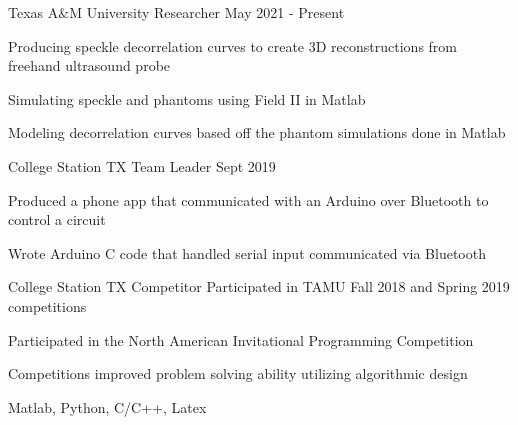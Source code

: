 \documentclass[11pt]{article} %
\begin{document}
\begin{description}
\squish

{Texas A$\&$M University}
{Researcher}
{May 2021 - Present}

Producing speckle decorrelation curves to create 3D reconstructions from freehand ultrasound probe

Simulating speckle and phantoms using Field II in Matlab

Modeling decorrelation curves based off the phantom simulations done in Matlab


{College Station TX}
{Team Leader}
{Sept 2019}

Produced a phone app that communicated with an Arduino over Bluetooth to control a circuit

Wrote Arduino C code that handled serial input communicated via Bluetooth

{College Station TX}
{Competitor}
{}
Participated in TAMU Fall 2018 and Spring 2019 competitions

Participated in the North American Invitational Programming Competition

Competitions improved problem solving ability utilizing algorithmic design


\end{description}


      {Matlab, Python, C/C++, Latex}

\end{document}
